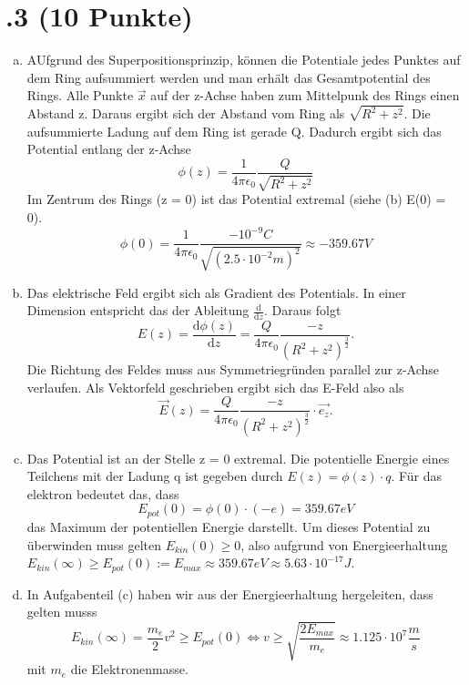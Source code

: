 \section*{\nr.3 \titthree (10 Punkte)}
\begin{enumerate}[(a)]
\item AUfgrund des Superpositionsprinzip, können die Potentiale jedes Punktes auf dem Ring aufsummiert werden und man erhält das Gesamtpotential des Rings. Alle Punkte $\vec{x} $ auf der z-Achse haben zum Mittelpunk des Rings einen Abstand z. Daraus ergibt sich der Abstand vom Ring als $\sqrt{R^2 + z^2}$. Die aufsummierte Ladung auf dem Ring ist gerade Q. Dadurch ergibt sich das Potential entlang der z-Achse
\begin{equation}
\phi(z) = \frac{1}{4\pi \epsilon_{0}} \frac{Q}{\sqrt{R^2 + z^2}}
\end{equation}
Im Zentrum des Rings (z = 0) ist das Potential extremal (siehe (b) E(0) = 0).
\begin{equation}
\phi(0) = \frac{1}{4\pi \epsilon_{0}} \frac{-10^{-9}C}{\sqrt{(2.5\cdot 10^{-2}m)^2}} \approx -359.67 V
\end{equation}
\item Das elektrische Feld ergibt sich als Gradient des Potentials. In einer Dimension entspricht das der Ableitung $\frac{\mathrm{d}}{\mathrm{d}z}$. Daraus folgt
\begin{equation}
E(z) = \frac{\mathrm{d}\phi (z)}{\mathrm{d}z}  = \frac{Q}{4\pi \epsilon_{0}} \frac{-z}{(R^2 + z^2)^{\frac{3}{2}}}.
\end{equation}
Die Richtung des Feldes muss aus Symmetriegründen parallel zur z-Achse verlaufen. Als Vektorfeld geschrieben ergibt sich das E-Feld also als
\begin{equation}
\vec{E}(z) = \frac{Q}{4\pi \epsilon_{0}} \frac{-z}{(R^2 + z^2)^{\frac{3}{2}}} \cdot \vec{e_{z}}.
\end{equation}
\item Das Potential ist an der Stelle z = 0 extremal. Die potentielle Energie eines Teilchens mit der Ladung q ist gegeben durch $E(z) = \phi(z) \cdot q$. Für das elektron bedeutet das, dass
\begin{equation}
E_{pot}(0) = \phi(0) \cdot (-e) = 359.67 eV
\end{equation}
das Maximum der potentiellen Energie darstellt. Um dieses Potential zu überwinden muss gelten $E_{kin}(0) \ge 0$, also aufgrund von Energieerhaltung $E_{kin}(\infty) \ge E_{pot}(0) := E_{max} \approx 359.67 eV \approx 5.63 \cdot 10^{-17} J$.
\item In Aufgabenteil (c) haben wir aus der Energieerhaltung hergeleiten, dass gelten musss
\begin{equation}
E_{kin}(\infty) = \frac{m_{e}}{2} v^2 \ge E_{pot}(0) \Leftrightarrow v \ge \sqrt{\frac{2E_{max}}{m_{e}}} \approx 1.125 \cdot 10^{7} \frac{m}{s}
\end{equation}
mit $m_{e}$ die Elektronenmasse.
\end{enumerate}
